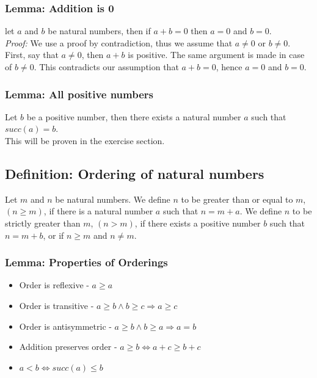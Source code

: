 \subsubsection*{Lemma: Addition is 0}
let $a$ and $b$ be natural numbers, then if $a + b = 0$ then $a = 0$ and $b = 0$.\\
\textit{Proof:} We use a proof by contradiction, thus we assume that $a \neq 0$ or $b \neq 0$. First, say that $a \neq 0$, then $a + b$ is positive. The same argument is made in case of $b \neq 0$. This contradicts our assumption that $a+b=0$, hence $a = 0$ and $b = 0$.

\subsubsection*{Lemma: All positive numbers}
Let $b$ be a positive number, then there exists a natural number $a$ such that $succ(a) = b$.\\
This will be proven in the exercise section.

\subsection{Definition: Ordering of natural numbers}
Let $m$ and $n$ be natural numbers. We define $n$ to be greater than or equal to $m$, $(n\geqslant m)$, if there is a natural number $a$ such that $n = m + a$. We define $n$ to be strictly greater than $m$, $(n>m)$, if there exists a positive number $b$ such that $n = m + b$, or if $n \geqslant m$ and $n \neq m$.

\subsubsection*{Lemma: Properties of Orderings}
\begin{itemize}
	\item[] Order is reflexive - $a\geqslant a$
	\item[] Order is transitive - $a\geqslant b \wedge b\geqslant c \Rightarrow a\geqslant c$
	\item[] Order is antisymmetric - $a \geqslant b \wedge b \geqslant a \Rightarrow a = b$
	\item[] Addition preserves order - $a \geqslant b \Leftrightarrow a + c \geqslant b + c$
	\item[] $a < b \Leftrightarrow succ(a) \leqslant b$
\end{itemize}

